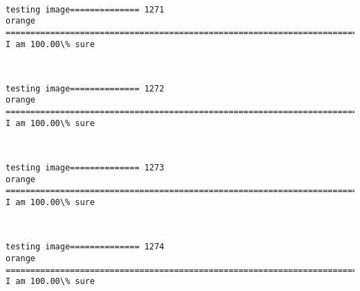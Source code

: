 \documentclass[11pt]{article}
\begin{document}
    \begin{center}
    \end{center}
    { \hspace*{\fill} \\}
    
    \begin{Verbatim}[commandchars=\\\{\}]
testing image============== 1271
orange
============================================================================
I am 100.00\% sure

    \end{Verbatim}

    \begin{center}
    \end{center}
    { \hspace*{\fill} \\}
    
    \begin{Verbatim}[commandchars=\\\{\}]
testing image============== 1272
orange
============================================================================
I am 100.00\% sure

    \end{Verbatim}

    \begin{center}
    \end{center}
    { \hspace*{\fill} \\}
    
    \begin{Verbatim}[commandchars=\\\{\}]
testing image============== 1273
orange
============================================================================
I am 100.00\% sure

    \end{Verbatim}

    \begin{center}
    \end{center}
    { \hspace*{\fill} \\}
    
    \begin{Verbatim}[commandchars=\\\{\}]
testing image============== 1274
orange
============================================================================
I am 100.00\% sure

    \end{Verbatim}
\end{document}

